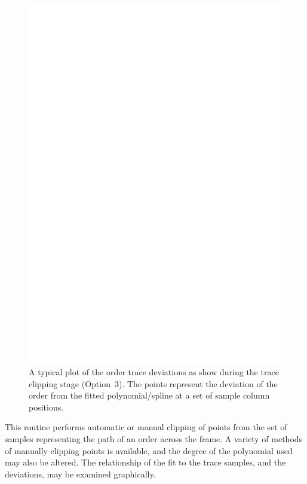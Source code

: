 \documentclass[11pt,twoside]{article}
\newcommand{\sunspec}[2]{#1}
\renewcommand{\sunspec}[2]{#2}
\begin{document}
\begin{figure}
\begin{center}
\includegraphics[width=\textwidth]{sun152_02.eps}

\parbox{140mm}{
\caption{A typical plot of the order trace deviations as show during
the trace clipping stage (Option~3).  The points represent the
deviation of the order from the fitted polynomial/spline at a set of
sample column positions.}
\label{fi_tclip}
}
\end{center}
\end{figure}

This routine performs automatic or manual  clipping of points from the
set of samples representing the path of an order across the frame.
A variety of methods of manually clipping points is available, and the degree
of the polynomial used may also be altered. The relationship of the fit
to the trace samples, and the deviations, may be examined graphically.
\end{document}
